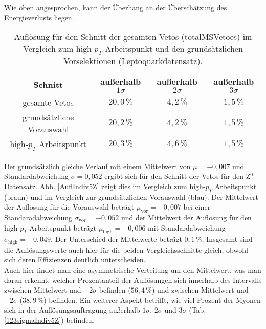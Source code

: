 Wie oben angesprochen, kann der Überhang an der Überschätzung des Energieverlusts liegen.
\begin{table}[htbp]
		\centering
		\begin{tabular*}{\linewidth}{@{\extracolsep{\fill}}cccc}
		\hline
		\hline
		\rule[-7pt]{0pt}{23pt} Schnitt & außerhalb $1\sigma$ & außerhalb $2\sigma$ & außerhalb $3\sigma$
		\\
		\hline
		\rule[-6pt]{0pt}{21pt} gesamte Vetos               & \(20,0\,\%\) & $4,2\,\%$ & $1,5\,\%$
		\\
		\rule[-6pt]{0pt}{21pt} grundsätzliche Vorauswahl   &  \(20,2\,\%\)	& $4,2\,\%$ & $1,5\,\%$
		\\
		\rule[-6pt]{0pt}{21pt} high-$p_T$ Arbeitspunkt     &  \(20,3\,\%\)	& $4,6\,\%$ & $1,5\,\%$
		\\
		\hline
		\hline
		\end{tabular*}
		\caption[Auflösung für den Schnitt der gesamten Vetos für den Leptoquarkdatensatz]{Auflösung für den Schnitt der gesamten Vetos (totalMSVetoes) im Vergleich zum high-$p_T$ Arbeitspunkt und den grundsätzlichen Vorselektionen (Leptoquarkdatensatz).}
		\label{123sigmaIndiv5LQ}
	\end{table}
Der grundsätzlich gleiche Verlauf mit einem Mittelwert von $\mu=-0,007$ und Standardabweichung $\sigma=0,052$ ergibt sich für den Schnitt der Vetos für den Z$^0$-Datensatz. Abb. \ref{AuflIndiv5Z} zeigt dies im Vergleich zum high-$p_T$ Arbeitspunkt (braun) und im Vergleich zur grundsätzlichen Vorauswahl (blau). Der Mittelwert der Auf\-lös\-ung für die Vorauswahl beträgt $\mu_{\text{vor}}=-0,007$ bei einer Standaradabweichung $\sigma_{\text{vor}}=-0,052$ und der Mittelwert der Auflösung für den high-$p_T$ Arbeitspunkt beträgt  $\mu_{\text{high}}=-0,006$ mit Standardabweichung $\sigma_{\text{high}}=-0,049$. Der Unterschied der Mittelwerte beträgt $0,1\,\%$. Insgesamt sind die Auflösungswerte auch hier für die beiden Vergleichsschnitte gleich, obwohl sich deren Effizienzen deutlich unterscheiden.\\
Auch hier findet man eine asymmetrische Verteilung um den Mittelwert, was man daran erkennt, welcher Prozentanteil der Auflösungen sich innerhalb des Intervalls zwischen Mittelwert und $+2\sigma$ befinden ($56,4\,\%$) und zwischen Mittelwert und $-2\sigma$ ($38,9\,\%$) befinden.
Ein weiterer Aspekt betrifft, wie viel Prozent der Myonen sich in der Auflösungsauftragung außerhalb $1\sigma$, $2\sigma$ und $3\sigma$ (Tab. \ref{123sigmaIndiv5Z}) befinden.\\ 

